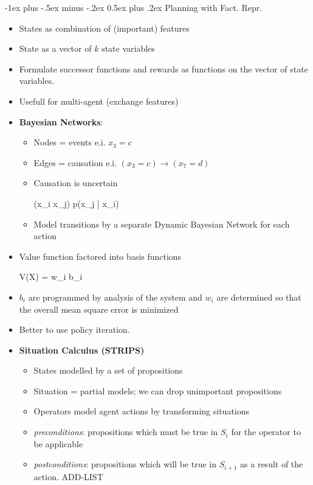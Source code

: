 \documentclass[10pt,a4paper,landscape]{article}
\makeatletter
\renewcommand{\section}{\@startsection{section}{1}{0mm}%
                                {-1ex plus -.5ex minus -.2ex}%
                                {0.5ex plus .2ex}%
                                {\normalfont\small\bfseries}}
\newenvironment{myalign*}{%
  \setlength{\abovedisplayskip}{3pt}%
  \setlength{\belowdisplayskip}{3pt}%
  \start@align\@ne\st@rredtrue\m@ne
}%
{\endalign}
\makeatother
\begin{document}
\begin{multicols*}{2}

\section{Planning with Fact. Repr.}
\begin{itemize}
	\item States as combination of (important) features 
	\item State as a vector of $k$ state variables
	\item Formulate successor functions and rewards as functions on the vector of state variables.
	\item Usefull for multi-agent (exchange features)
	\item \textbf{Bayesian Networks}:
	\begin{itemize}
		\item Nodes = events e.i. $x_3 = c$ 
		\item Edges = causation e.i. $(x_3 = c) \rightarrow (x_7 = d)$
		\item Causation is uncertain
		\begin{myalign*}
		    (x_i \rightarrow x_j) \Rightarrow p(x_j | x_i)
		\end{myalign*}
		\item Model transitions by a separate Dynamic Bayesian Network for each action
	\end{itemize}
	\item Value function factored into basis functions
	\begin{myalign*}
	    V(X) = \sum w_i b_i
	\end{myalign*}
	\item $b_i$ are programmed by analysis of the system and $w_i$ are determined so that the overall mean square error is minimized
	\item Better to use policy iteration.
	\item \textbf{Situation Calculus (STRIPS)}
	\begin{itemize}
		\item States modelled by a set of propositions
		\item Situation = partial models; we can drop unimportant propositions
		\item Operators model agent actions by transforming situations
		\item \textit{preconditions}: propositions which must be true in $S_i$ for the operator to be applicable
		\item \textit{postconditions}: propositions which will be true in $S_{i + 1}$ as a result of the action. ADD-LIST

\end{itemize}
\end{itemize}
\end{multicols*}
\end{document}
